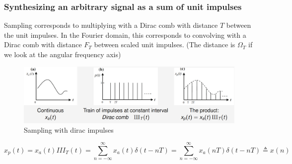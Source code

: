 \documentclass{article}
\begin{document}
\subsubsection{Synthesizing an arbitrary signal as a sum of unit impulses}

Sampling corresponds to multiplying with a Dirac comb with distance $T$ between the unit impulses.
In the Fourier domain, this corresponds to convolving with a Dirac comb with distance $F_T$ between
scaled unit impulses. (The distance is $\Omega_T$ if we look at the angular frequency axis)
\begin{figure}[h!]
    \centering
    \includegraphics[width=1\textwidth]{figures/Sampling and reconstruction/Sampling_dirac_impulses.png}
    \caption{Sampling with dirac impulses}
    \label{fig:sampling_dirac_impulses}
\end{figure}
\begin{equation}
    x_p (t) = x_a (t) III_T (t) = \sum_{n=-\infty}^{\infty} x_a (t) \delta (t - nT) = \sum_{n=-\infty}^{\infty} x_a (nT) \delta (t - nT) \triangleq x(n)
\end{equation}

\clearpage
\end{document}
